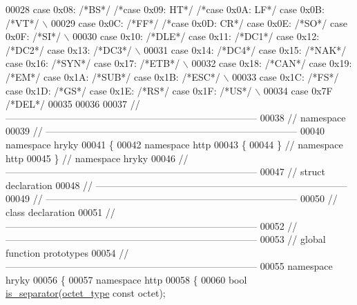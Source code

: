 \begin{DoxyCode}
{00028 case 0x08: \textcolor{comment}{/*BS*/} \textcolor{comment}{/*case 0x09: HT*/} \textcolor{comment}{/*case 0x0A: LF*/} case 0x0B: \textcolor{comment}{/*VT*/} \(\backslash\)
00029 case 0x0C: \textcolor{comment}{/*FF*/} \textcolor{comment}{/*case 0x0D: CR*/} case 0x0E: \textcolor{comment}{/*SO*/} case 0x0F: \textcolor{comment}{/*SI*/} \(\backslash\)
00030 case 0x10: \textcolor{comment}{/*DLE*/} case 0x11: \textcolor{comment}{/*DC1*/} case 0x12: \textcolor{comment}{/*DC2*/} case 0x13: \textcolor{comment}{/*DC3*/} \(\backslash\)
00031 case 0x14: \textcolor{comment}{/*DC4*/} case 0x15: \textcolor{comment}{/*NAK*/} case 0x16: \textcolor{comment}{/*SYN*/} case 0x17: \textcolor{comment}{/*ETB*/} \(\backslash\)
00032 case 0x18: \textcolor{comment}{/*CAN*/} case 0x19: \textcolor{comment}{/*EM*/} case 0x1A: \textcolor{comment}{/*SUB*/} case 0x1B: \textcolor{comment}{/*ESC*/} \(\backslash\)
00033 case 0x1C: \textcolor{comment}{/*FS*/} case 0x1D: \textcolor{comment}{/*GS*/} case 0x1E: \textcolor{comment}{/*RS*/} case 0x1F: \textcolor{comment}{/*US*/} \(\backslash\)
00034 case 0x7F \textcolor{comment}{/*DEL*/}
00035 
00036 
00037 \textcolor{comment}{//
      ------------------------------------------------------------------------------}
00038 \textcolor{comment}{// namespace}
00039 \textcolor{comment}{//
      ------------------------------------------------------------------------------}
00040 \textcolor{keyword}{namespace }hryky
00041 \{
00042 \textcolor{keyword}{namespace }http
00043 \{
00044 \} \textcolor{comment}{// namespace http}
00045 \} \textcolor{comment}{// namespace hryky}
00046 \textcolor{comment}{//
      ------------------------------------------------------------------------------}
00047 \textcolor{comment}{// struct declaration}
00048 \textcolor{comment}{//
      ------------------------------------------------------------------------------}
00049 \textcolor{comment}{//
      ------------------------------------------------------------------------------}
00050 \textcolor{comment}{// class declaration}
00051 \textcolor{comment}{//
      ------------------------------------------------------------------------------}
00052 \textcolor{comment}{//
      ------------------------------------------------------------------------------}
00053 \textcolor{comment}{// global function prototypes}
00054 \textcolor{comment}{//
      ------------------------------------------------------------------------------}
00055 \textcolor{keyword}{namespace }hryky
00056 \{
00057 \textcolor{keyword}{namespace }http
00058 \{
00060     \textcolor{keywordtype}{bool} \hyperlink{namespacehryky_1_1http_a6ddc3f4da8f8a139b2710f91d20e2f2b}{is_separator}(\hyperlink{namespacehryky_a488cba8b666be33ccca70e819684e3c8}{octet_type} \textcolor{keyword}{const} octet);
}
\end{DoxyCode}
